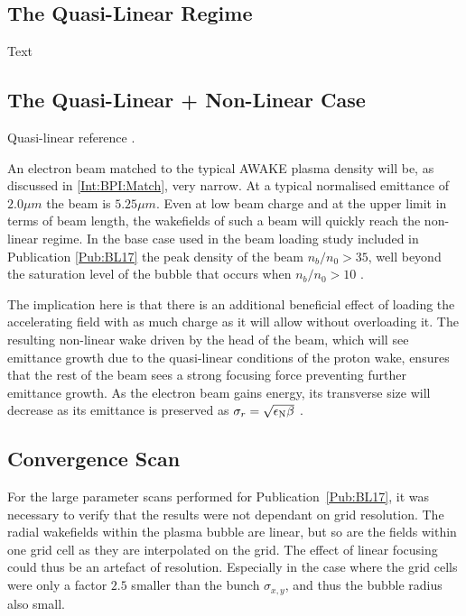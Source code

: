 \subsection{The Quasi-Linear Regime}
\label{Sim:QLin}

Text

\subsection{The Quasi-Linear + Non-Linear Case}
\label{Sim:QLinNonLin}

Quasi-linear reference \cite{rosenzweig:2010}.

An electron beam matched to the typical AWAKE plasma density will be, as discussed in \ref{Int:BPI:Match}, very narrow. At a typical normalised emittance of $2.0\unit{\mu m}$ the beam is $5.25\unit{\mu m}$. Even at low beam charge and at the upper limit in terms of beam length, the wakefields of such a beam will quickly reach the non-linear regime. In the base case used in the beam loading study included in Publication \ref{Pub:BL17} \cite{berglyd_olsen:2018} the peak density of the beam $n_b/n_0 > 35$, well beyond the saturation level of the bubble that occurs when $n_b/n_0 > 10$ \cite{lu:2005}.

The implication here is that there is an additional beneficial effect of loading the accelerating field with as much charge as it will allow without overloading it. The resulting non-linear wake driven by the head of the beam, which will see emittance growth due to the quasi-linear conditions of the proton wake, ensures that the rest of the beam sees a strong focusing force preventing further emittance growth. As the electron beam gains energy, its transverse size will decrease as its emittance is preserved as $\sigma_{r} = \sqrt{\epsilon_{\mathrm{N}}\beta}$ \cite{wille:2001}.

\subsection{Convergence Scan}
\label{Sim:Converge}

For the large parameter scans performed for Publication~\ref{Pub:BL17}, it was necessary to verify that the results were not dependant on grid resolution.
The radial wakefields within the plasma bubble are linear, but so are the fields within one grid cell as they are interpolated on the grid.
The effect of linear focusing could thus be an artefact of resolution.
Especially in the case where the grid cells were only a factor $2.5$ smaller than the bunch $\sigma_{x,y}$, and thus the bubble radius also small.


